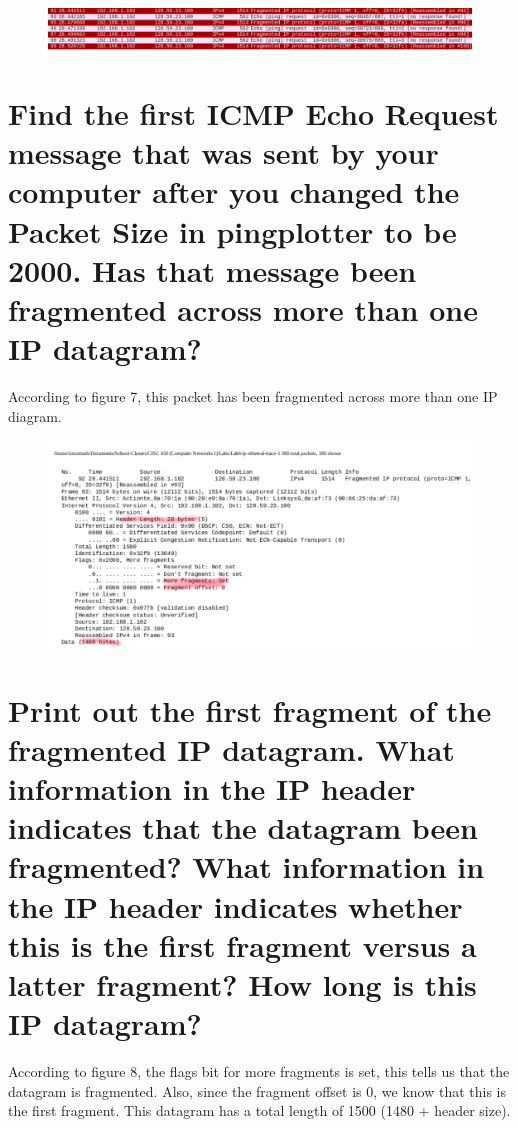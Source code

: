 \documentclass{article}
\begin{document}
\begin{figure}[h!]
\centering
\includegraphics[scale=0.5]{Q10.png}
\caption{}
\end{figure}

\section*{Find the first ICMP Echo Request message that was sent by your computer after
you changed the Packet Size in pingplotter to be 2000. Has that message been
fragmented across more than one IP datagram?}

According to figure 7, this packet has been fragmented across more than one IP diagram.\\

\begin{figure}[h!]
\centering
\includegraphics[scale=0.5]{Q11.pdf}
\caption{}
\end{figure}

\section*{Print out the first fragment of the fragmented IP datagram. What information in
the IP header indicates that the datagram been fragmented? What information in
the IP header indicates whether this is the first fragment versus a latter fragment?
How long is this IP datagram?}
According to figure 8, the flags bit for more fragments is set, this tells us that the datagram is fragmented.  Also, since the fragment offset is 0, we know that this is the first fragment.  This datagram has a total length of 1500 (1480 + header size).\\
\end{document}
